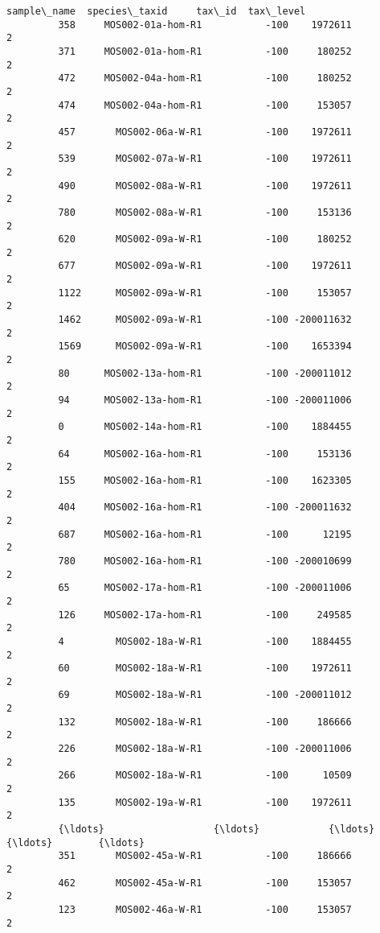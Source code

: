 \documentclass[11pt]{article}
\begin{document}
\begin{Verbatim}[commandchars=\\\{\}]
                       sample\_name  species\_taxid     tax\_id  tax\_level  
         358     MOS002-01a-hom-R1           -100    1972611          2  
         371     MOS002-01a-hom-R1           -100     180252          2  
         472     MOS002-04a-hom-R1           -100     180252          2  
         474     MOS002-04a-hom-R1           -100     153057          2  
         457       MOS002-06a-W-R1           -100    1972611          2  
         539       MOS002-07a-W-R1           -100    1972611          2  
         490       MOS002-08a-W-R1           -100    1972611          2  
         780       MOS002-08a-W-R1           -100     153136          2  
         620       MOS002-09a-W-R1           -100     180252          2  
         677       MOS002-09a-W-R1           -100    1972611          2  
         1122      MOS002-09a-W-R1           -100     153057          2  
         1462      MOS002-09a-W-R1           -100 -200011632          2  
         1569      MOS002-09a-W-R1           -100    1653394          2  
         80      MOS002-13a-hom-R1           -100 -200011012          2  
         94      MOS002-13a-hom-R1           -100 -200011006          2  
         0       MOS002-14a-hom-R1           -100    1884455          2  
         64      MOS002-16a-hom-R1           -100     153136          2  
         155     MOS002-16a-hom-R1           -100    1623305          2  
         404     MOS002-16a-hom-R1           -100 -200011632          2  
         687     MOS002-16a-hom-R1           -100      12195          2  
         780     MOS002-16a-hom-R1           -100 -200010699          2  
         65      MOS002-17a-hom-R1           -100 -200011006          2  
         126     MOS002-17a-hom-R1           -100     249585          2  
         4         MOS002-18a-W-R1           -100    1884455          2  
         60        MOS002-18a-W-R1           -100    1972611          2  
         69        MOS002-18a-W-R1           -100 -200011012          2  
         132       MOS002-18a-W-R1           -100     186666          2  
         226       MOS002-18a-W-R1           -100 -200011006          2  
         266       MOS002-18a-W-R1           -100      10509          2  
         135       MOS002-19a-W-R1           -100    1972611          2  
         {\ldots}                   {\ldots}            {\ldots}        {\ldots}        {\ldots}  
         351       MOS002-45a-W-R1           -100     186666          2  
         462       MOS002-45a-W-R1           -100     153057          2  
         123       MOS002-46a-W-R1           -100     153057          2  

\end{Verbatim}
\end{document}
